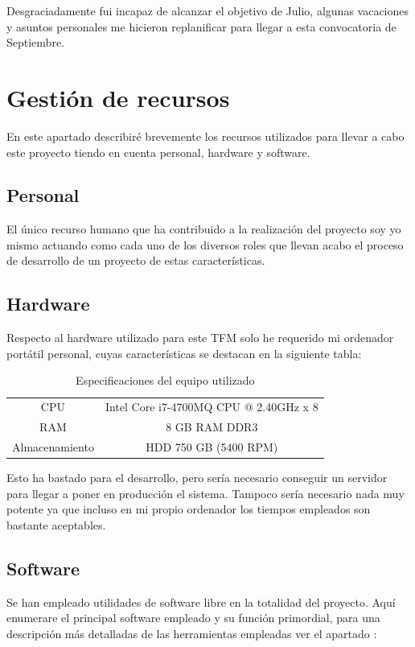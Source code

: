 Desgraciadamente fui incapaz de alcanzar el objetivo de Julio, algunas vacaciones y asuntos personales me hicieron replanificar para llegar a esta convocatoria de Septiembre.

\section{Gestión de recursos}
En este apartado describiré brevemente los recursos utilizados para llevar a cabo este proyecto tiendo en cuenta personal, hardware y software.

\subsection{Personal}
El único recurso humano que ha contribuido a la realización del proyecto soy yo mismo actuando como cada uno de los diversos roles que llevan acabo el proceso de desarrollo de un proyecto de estas características.

\subsection{Hardware}
Respecto al hardware utilizado para este \acrshort{TFM} solo he requerido mi ordenador portátil personal, cuyas características se destacan en la siguiente tabla:

\begin{table} [h!]
	\centering
	\begin{tabular}{c c}
		\hline
		CPU       & Intel \textregistered  Core \texttrademark  i7-4700MQ CPU @ 2.40GHz x 8 \\
		RAM       & 8 GB RAM DDR3                                                           \\
		Almacenamiento & HDD 750 GB (5400 RPM)                                                   \\ \hline
	\end{tabular}
	\caption{Especificaciones del equipo utilizado}
\end{table}

Esto ha bastado para el desarrollo, pero sería necesario conseguir un servidor para llegar a poner en producción el sistema. Tampoco sería necesario nada muy potente ya que incluso en mi propio ordenador los tiempos empleados son bastante aceptables.

\subsection{Software}
Se han empleado utilidades de software libre en la totalidad del proyecto. Aquí enumerare el principal software empleado y su función primordial, para una descripción más detalladas de las herramientas empleadas ver el apartado :

